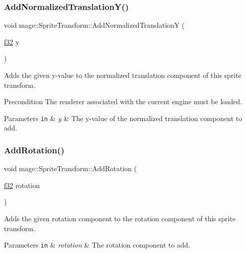 \subsubsection{\texorpdfstring{Add\+Normalized\+Translation\+Y()}{AddNormalizedTranslationY()}}
{\footnotesize\ttfamily void mage\+::\+Sprite\+Transform\+::\+Add\+Normalized\+TranslationY (\begin{DoxyParamCaption}\item[{\hyperlink{namespacemage_a6a44ad388483959dc4dff9f2aef91431}{f32}}]{y }\end{DoxyParamCaption})}

Adds the given y-\/value to the normalized translation component of this sprite transform.

\begin{DoxyPrecond}{Precondition}
The renderer associated with the current engine must be loaded. 
\end{DoxyPrecond}

\begin{DoxyParams}[1]{Parameters}
\mbox{\tt in}  & {\em y} & The y-\/value of the normalized translation component to add. \\
\hline
\end{DoxyParams}
\hypertarget{structmage_1_1_sprite_transform_abc56f2d334a5adcb9bdd64c5424c1da7}{}\label{structmage_1_1_sprite_transform_abc56f2d334a5adcb9bdd64c5424c1da7} 
\subsubsection{\texorpdfstring{Add\+Rotation()}{AddRotation()}}
{\footnotesize\ttfamily void mage\+::\+Sprite\+Transform\+::\+Add\+Rotation (\begin{DoxyParamCaption}\item[{\hyperlink{namespacemage_a6a44ad388483959dc4dff9f2aef91431}{f32}}]{rotation }\end{DoxyParamCaption})\hspace{0.3cm}{\ttfamily [noexcept]}}

Adds the given rotation component to the rotation component of this sprite transform.


\begin{DoxyParams}[1]{Parameters}
\mbox{\tt in}  & {\em rotation} & The rotation component to add. \\
\hline
\end{DoxyParams}
\hypertarget{structmage_1_1_sprite_transform_a1dce8e3f578d474fb871d0e7a537540d}{}\label{structmage_1_1_sprite_transform_a1dce8e3f578d474fb871d0e7a537540d} 
